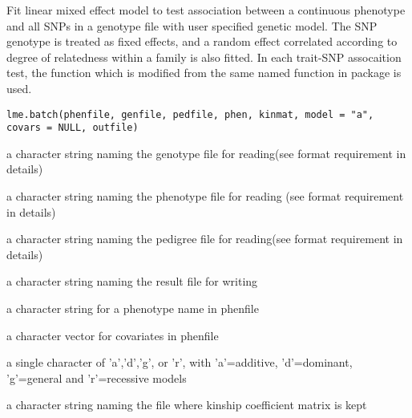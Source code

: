 \begin{Description}\relax
Fit linear mixed effect model to test association between a continuous phenotype 
and all SNPs in a genotype file with user specified genetic model. The SNP genotype is treated
as fixed effects, and a random effect correlated according to degree of relatedness within a 
family is also fitted.
In each trait-SNP assocaition test, the  function which is modified from
the same named function in package  is used.
\end{Description}
\begin{Usage}
\begin{verbatim}
lme.batch(phenfile, genfile, pedfile, phen, kinmat, model = "a", 
covars = NULL, outfile)
\end{verbatim}
\end{Usage}
\begin{Arguments}
\begin{ldescription}
\item[\code{genfile}] a character string naming the genotype file for reading(see format requirement in details) 
\item[\code{phenfile}] a character string naming the phenotype file for reading (see format requirement in details) 
\item[\code{pedfile}] a character string naming the pedigree file for reading(see format requirement in details) 
\item[\code{outfile}] a character string naming the result file for writing 
\item[\code{phen}] a character string for a phenotype name in phenfile 
\item[\code{covars}] a character vector for covariates in phenfile 
\item[\code{model}] a single character of 'a','d','g', or 'r', with 'a'=additive, 'd'=dominant, 'g'=general and 'r'=recessive models 
\item[\code{kinmat}] a character string naming the file where kinship coefficient matrix is kept 
\end{ldescription}
\end{Arguments}
